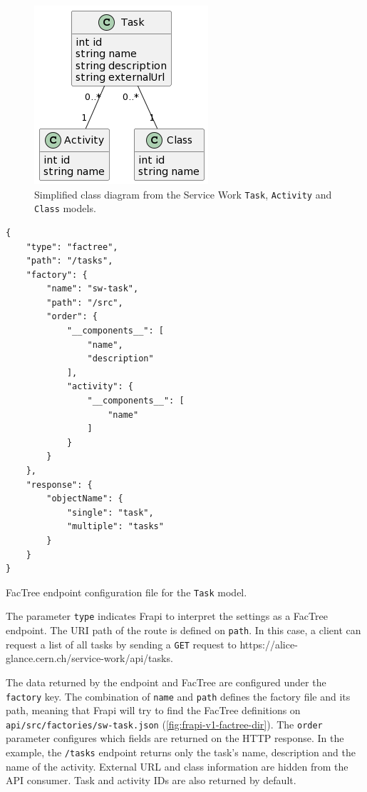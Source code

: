 \begin{figure}[htbp]
  \centering
  \includegraphics[scale=0.77]{Imagens/chap03/class-diagram-sw-task.png}
  \caption{Simplified class diagram from the Service Work \texttt{Task}, \texttt{Activity} and \texttt{Class} models.}
  \label{fig:class-diagram-sw-task}
\end{figure}

\begin{listing}[htbp]
\begin{verbatim}
{
    "type": "factree",
    "path": "/tasks",
    "factory": {
        "name": "sw-task",
        "path": "/src",
        "order": {
            "__components__": [
                "name",
                "description"
            ],
            "activity": {
                "__components__": [
                    "name"
                ]
            }
        }
    },
    "response": {
        "objectName": {
            "single": "task",
            "multiple": "tasks"
        }
    }
}
\end{verbatim}
\caption{FacTree endpoint configuration file for the \texttt{Task} model.}
\label{code:task-factree-endpoint-settings}
\end{listing}

The parameter \texttt{type} indicates Frapi to interpret the settings as a FacTree endpoint. The URI path of the route is defined on \texttt{path}. In this case, a client can request a list of all tasks by sending a \texttt{GET} request to https://alice-glance.cern.ch/service-work/api/tasks.

The data returned by the endpoint and FacTree are configured under the \texttt{factory} key.  The combination of \texttt{name} and \texttt{path} defines the factory file and its path, meaning that Frapi will try to find the FacTree definitions on \texttt{api/src/factories/sw-task.json} (\autoref{fig:frapi-v1-factree-dir}). The \texttt{order} parameter configures which fields are returned on the HTTP response. In the example, the \texttt{/tasks} endpoint returns only the task's name, description and the name of the activity. External URL and class information are hidden from the API consumer. Task and activity IDs are also returned by default.


